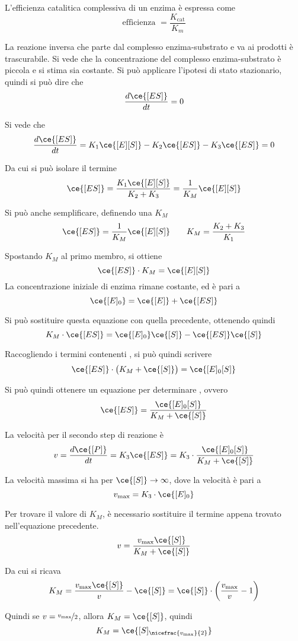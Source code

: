 L'efficienza catalitica complessiva di un enzima è espressa come
\[
\text{efficienza } = \frac{K_{\text{cat}}}{K_m}
\]

La reazione inversa che parte dal complesso enzima-substrato e va ai prodotti è trascurabile. Si vede che la concentrazione del complesso enzima-substrato \ce{[ES]} è piccola e si stima sia costante. Si può applicare l'ipotesi di stato stazionario, quindi si può dire che
\[
\frac{d \ce{[ES]}}{dt} = 0
\]

Si vede che
\[
\frac{d \ce{[ES]}}{dt} = K_1 \ce{[E][S]} - K_2 \ce{[ES]} - K_3 \ce{[ES]} = 0
\]

Da cui si può isolare il termine \ce{[ES]}
\[
\ce{[ES]} = \frac{K_1 \ce{[E][S]}}{K_2 + K_3} = \frac{1}{K_M} \ce{[E][S]}
\]

Si può anche semplificare, definendo una $K_M$
\[
\ce{[ES]} = \frac{1}{K_M} \ce{[E][S]} \qquad K_M = \frac{K_2 + K_3}{K_1}
\]

Spostando $K_M$ al primo membro, si ottiene
\[
\ce{[ES]} \cdot K_M = \ce{[E][S]}
\]
La concentrazione iniziale di enzima rimane costante, ed è pari a
\[
\ce{[E]_{0}} = \ce{[E]} + \ce{[ES]}
\]

Si può sostituire questa equazione con quella precedente, ottenendo quindi
\[
K_M \cdot \ce{[ES]} = \ce{[E]_{0}} \ce{[S]} - \ce{[ES]} \ce{[S]}
\]

Raccogliendo i termini contenenti \ce{[ES]}, si può quindi scrivere
\[
\ce{[ES]} \cdot \bigl(K_M + \ce{[S]} \bigr) = \ce{[E]_{0} [S]}
\]

Si può quindi ottenere un equazione per determinare \ce{[ES]}, ovvero
\[
\ce{[ES]} = \frac{\ce{[E]_{0} [S]}}{K_M + \ce{[S]}}
\]

La velocità per il secondo step di reazione è
\[
v = \frac{d \ce{[P]}}{dt} = K_3 \ce{[ES]} = K_3 \cdot \frac{\ce{[E]_{0} [S]}}{K_M + \ce{[S]}}
\]

La velocità massima si ha per $\ce{[S]} \to \infty$, dove la velocità è pari a
\[
v_{\text{max}} = K_3 \cdot \ce{[E]_{0}}
\]

Per trovare il valore di $K_M$, è necessario sostituire il termine appena trovato nell'equazione precedente.
\[
v = \frac{v_{\text{max}} \ce{[S]}}{K_M + \ce{[S]}}
\]

Da cui si ricava
\[
K_M = \frac{v_{\text{max}}\ce{[S]}}{v} - \ce{[S]} = \ce{[S]} \cdot \biggl(\frac{v_{\text{max}}}{v} - 1 \biggr)
\]

Quindi se $v = \nicefrac{v_{\text{max}}}{2}$, allora $K_M = \ce{[S]}$, quindi
\[
K_M = \ce{[S]_{\nicefrac{v_{\text{max}}}{2}}}
\]

